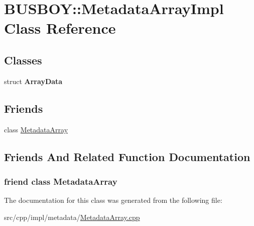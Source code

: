 \hypertarget{classBUSBOY_1_1MetadataArrayImpl}{
\section{BUSBOY::MetadataArrayImpl Class Reference}
\label{classBUSBOY_1_1MetadataArrayImpl}
}
\subsection*{Classes}
\begin{DoxyCompactItemize}
\item 
struct {\bfseries ArrayData}
\end{DoxyCompactItemize}
\subsection*{Friends}
\begin{DoxyCompactItemize}
\item 
class \hyperlink{classBUSBOY_1_1MetadataArrayImpl_add505bc5c0b6c4d9834c83dfa1be1e77}{MetadataArray}
\end{DoxyCompactItemize}


\subsection{Friends And Related Function Documentation}
\hypertarget{classBUSBOY_1_1MetadataArrayImpl_add505bc5c0b6c4d9834c83dfa1be1e77}{
\subsubsection[{MetadataArray}]{\setlength{\rightskip}{0pt plus 5cm}friend class {\bf MetadataArray}}}
\label{classBUSBOY_1_1MetadataArrayImpl_add505bc5c0b6c4d9834c83dfa1be1e77}


The documentation for this class was generated from the following file:\begin{DoxyCompactItemize}
\item 
src/cpp/impl/metadata/\hyperlink{MetadataArray_8cpp}{MetadataArray.cpp}\end{DoxyCompactItemize}
